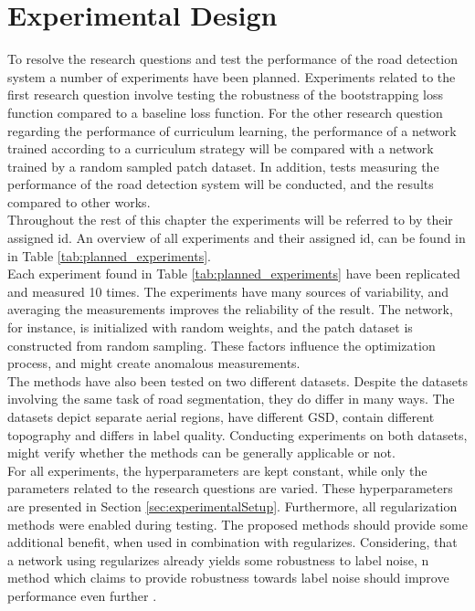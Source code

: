\section{Experimental Design}
\label{sec:experimentalPlan}
To resolve the research questions and test the performance of the road detection system a number of experiments have been planned. Experiments related to the first research question involve testing the robustness of the bootstrapping loss function compared to a baseline loss function. For the other research question regarding the performance of curriculum learning, the performance of a network trained according to a curriculum strategy will be compared with a network trained by a random sampled patch dataset. In addition, tests measuring the performance of the road detection system will be conducted, and the results compared to other works.\\

 Throughout the rest of this chapter the experiments will be referred to by their assigned id. An overview of all experiments and their assigned id, can be found in in Table \ref{tab:planned_experiments}.\\

Each experiment found in Table \ref{tab:planned_experiments} have been replicated and measured 10 times. The experiments have many sources of variability, and averaging the measurements improves the reliability of the result. The network, for instance, is initialized with random weights, and the patch dataset is constructed from random sampling. These factors influence the optimization process, and might create anomalous measurements.\\

The methods have also been tested on two different datasets. Despite the datasets involving the same task of road segmentation, they do differ in many ways. The datasets depict separate aerial regions, have different \ac{GSD}, contain different topography and differs in label quality. Conducting experiments on both datasets, might verify whether the methods can be generally applicable or not.\\

For all experiments, the hyperparameters are kept constant, while only the parameters related to the research questions are varied. These hyperparameters are presented in Section \ref{sec:experimentalSetup}. Furthermore, all regularization methods were enabled during testing. The proposed methods should provide some additional benefit, when used in combination with regularizes. Considering, that a network using regularizes already yields some robustness to label noise, n method which claims to provide robustness towards label noise should improve performance even further .  \\

